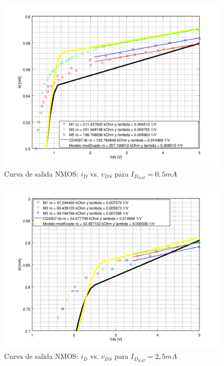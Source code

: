 \documentclass[10pt,spanish,a4paper,openany,notitlepage]{article}
\begin{document}
\begin{figure}[H] %
\begin{center}
\includegraphics[scale=0.65]{./octave/N_ID_VDS_500.png}
\caption{Curva de salida NMOS: $i_D$ vs. $v_{DS}$ para $I_{D_{SAT}} = 0,5 \unit{mA}$}
 \label{fig:N_ID_VDS_500}
\end{center}
\end{figure}

\begin{figure}[H] %
\begin{center}
\includegraphics[scale=0.65]{./octave/N_ID_VDS_2500.png}
\caption{Curva de salida NMOS: $i_D$ vs. $v_{DS}$ para $I_{D_{SAT}} = 2,5 \unit{mA}$}
 \label{fig:N_ID_VDS_2500}
\end{center}
\end{figure}
\end{document}
